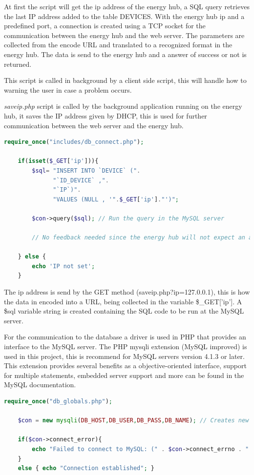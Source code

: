 At first the script will get the ip address of the energy hub, a SQL query retrieves the last IP address added to the table DEVICES. With the energy hub ip and a predefined port, a connection is created using a TCP socket for the communication between the energy hub and the web server. The parameters are collected from the encode URL and translated to a recognized format in the energy hub. The data is send to the energy hub and a answer of success or not is returned.

This script is called in background by a client side script, this will handle how to warning the user in case a problem occurs.


\textit{saveip.php} script is called by the background application running on the energy hub, it saves the IP address given by DHCP, this is used for further communication between the web server and the energy hub.
\begin{lstlisting}[language=php]
	require_once("includes/db_connect.php");

	if(isset($_GET['ip'])){
		$sql= "INSERT INTO `DEVICE` (".
			  "`ID_DEVICE` ,".
		  	  "`IP`)".
		  	  "VALUES (NULL , '".$_GET['ip']."')";
	
		$con->query($sql); // Run the query in the MySQL server
		
		// No feedback needed since the energy hub will not expect an answer.
		
	} else {
		echo 'IP not set';
	}
\end{lstlisting}
The ip address is send by the GET method (saveip.php?ip=127.0.0.1), this is how the data in encoded into a URL, being collected in the variable \$\_GET['ip']. 
A \$sql variable string is created containing the SQL code to be run at the MySQL server.


For the communication to the database a driver is used in PHP that provides an interface to the MySQL server. The PHP mysqli extension (MySQL improved) is used in this project, this is recommend for MySQL servers version 4.1.3 or later. This extension provides several benefits as a objective-oriented interface, support for multiple statements, embedded server support and more can be found in the MySQL documentation.

\begin{lstlisting}[language=php]
	require_once("db_globals.php");
	
	$con = new mysqli(DB_HOST,DB_USER,DB_PASS,DB_NAME); // Creates new mysql connection
	
	if($con->connect_error){
		echo "Failed to connect to MySQL: (" . $con->connect_errno . " ) ". $con->connect_error;
	} 
	else { echo "Connection established"; }
\end{lstlisting}

